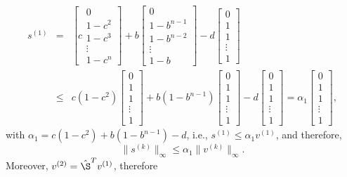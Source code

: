 \begin{eqnarray*}
\label{eq:alpha_1}
s^{(1)}
&=&
\left[
c
\begin{array}{c}
0\\1-c^2\\1-c^3\\\vdots\\1-c^n
\end{array}
\right]
+
b
\left[
\begin{array}{c}
0\\1-b^{n-1}\\1-b^{n-2}\\\vdots\\1-b
\end{array}
\right]
-
d
\left[
\begin{array}{c}
0\\1\\1\\\vdots\\1
\end{array}
\right]\\
&\leq &
c(1-c^{2})
\left[
\begin{array}{c}
0\\1\\1\\\vdots\\1
\end{array}
\right]
+
b(1-b^{n-1})
\left[
\begin{array}{c}
0\\1\\1\\\vdots\\1
\end{array}
\right]
-
d
\left[
\begin{array}{c}
0\\1\\1\\\vdots\\1
\end{array}
\right]=
\alpha_1\left[
\begin{array}{c}
0\\1\\1\\\vdots\\1
\end{array}
\right],
\end{eqnarray*}
with $\alpha_1=c(1-c^{2})+b(1-b^{n-1})-d$, i.e., $s^{(1)}\leq\alpha_1v^{(1)}$,
and therefore,
\[
\|s^{(k)}\|_{\infty}\leq\alpha_1\|v^{(k)}\|_{\infty}.
\]
Moreover, $v^{(2)} = \hat{\S}^{T}v^{(1)}$, therefore
